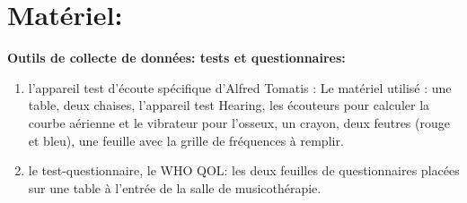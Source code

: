 








\section{Matériel: }

\textbf{Outils de collecte de données: tests et questionnaires: }
\begin{enumerate}
	\item  l'appareil  test d'écoute spécifique d'Alfred Tomatis : 
Le matériel utilisé : une table, deux chaises, l'appareil
test Hearing, les écouteurs pour calculer la courbe  aérienne et le vibrateur pour l'osseux, un crayon, 
deux
feutres (rouge et bleu), une feuille avec la grille de fréquences à
remplir.
	\item le test-questionnaire, le WHO QOL: 
les deux feuilles de questionnaires placées sur une table à l'entrée de la salle de musicothérapie.
\end{enumerate}


